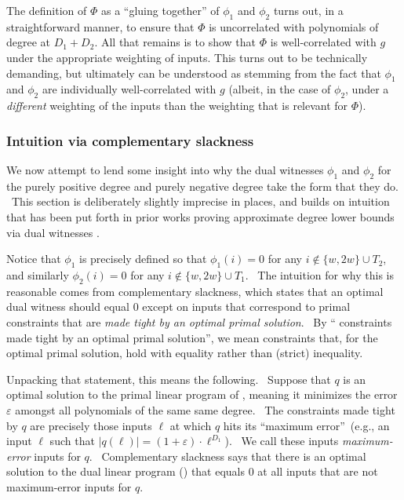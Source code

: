 The definition of $\Phi$
as a ``gluing together'' of $\phi_1$ and $\phi_2$
turns out, in a
straightforward manner, to ensure
that $\Phi$ is uncorrelated
with polynomials of degree at 
$D_1 + D_2$. 
All that remains is to
show that $\Phi$ is well-correlated
with $g$ under the appropriate
weighting of inputs. 
This turns out to be technically demanding, but ultimately
can be understood as stemming from the fact that 
$\phi_1$ and $\phi_2$ are individually
well-correlated with $g$ (albeit, in the case of $\phi_2$, under a
\emph{different} weighting of the inputs than the weighting that is relevant for $\Phi$). 

\subsubsection{Intuition via complementary slackness}

\label{s:nextsubsection}We now attempt to lend some insight into why the
dual witnesses $\phi_1 $ and $\phi_2 $ for the purely positive degree and purely
negative degree take the form that they do. \ This section is deliberately
slightly imprecise in places, and builds on intuition that has been put
forth in prior works proving approximate degree lower bounds via dual
witnesses \cite{bt13, Tha16, bkt}.

Notice that $\phi_1 $ is precisely defined so that $\phi_1 (i)=0$ for any $
i\not\in \{w,2w\}\cup T_{2}$, and similarly $\phi_2 (i)=0$ for any $i\not\in
\{w,2w\}\cup T_{1}$. \ The intuition for why this is reasonable comes from
complementary slackness, which states that an optimal dual witness should
equal $0$ except on inputs that correspond to primal constraints that are
\emph{made tight by an optimal primal solution}. \ By \textquotedblleft
constraints made tight by an optimal primal solution\textquotedblright , we
mean constraints that, for the optimal primal solution, hold with equality
rather than (strict) inequality.

Unpacking that statement, this means the following. \ Suppose that $q$ is an
optimal solution to the primal linear program of , meaning it
minimizes the error $\varepsilon $ amongst all polynomials of the same same
degree. \ The constraints made tight by $q$ are precisely those inputs $\ell
$ at which $q$ hits its \textquotedblleft maximum error\textquotedblright\
(e.g., an input $\ell$ such that $|q(\ell)|=(1+\varepsilon )\cdot \ell ^{D_{1}}$).
\ We call these inputs \emph{maximum-error} inputs for $q$. \ Complementary
slackness says that there is an optimal solution to the dual linear program ()
that equals $0$ at all inputs that are not maximum-error inputs for $q$.

